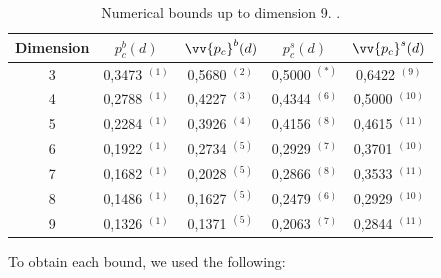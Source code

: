 \documentclass{aptpub}
\begin{document}
\begin{table}[h!]
    \centering

\bigskip
   
\begin{tabular}{|c|c|c|c|c|}  

\hline
\textbf{Dimension} & $p_c^b(d)$ & $\vv{p_c}^b(d)$ & $p_c^s(d)$ &   $\vv{p_c}^s(d)$\\ \hline

3 & 0,3473 $^{(1)}$ &0,5680 $^{(2)}$&0,5000 $^{(*)}$&0,6422 $^{(9)}$\\   \hline

4 & 0,2788 $^{(1)}$ &0,4227 $^{(3)}$&0,4344 $^{(6)}$&0,5000 $^{(10)}$ \\   \hline

5 & 0,2284 $^{(1)}$ & 0,3926 $^{(4)}$&0,4156 $^{(8)}$& 0,4615 $^{(11)}$\\   \hline

6 & 0,1922 $^{(1)}$& 0,2734 $^{(5)}$ & 0,2929 $^{(7)}$& 0,3701 $^{(10)}$\\   \hline

7 & 0,1682  $^{(1)}$& 0,2028 $^{(5)}$& 0,2866 $^{(8)}$& 0,3533 $^{(11)}$\\   \hline

8 & 0,1486 $^{(1)}$&0,1627  $^{(5)}$& 0,2479 $^{(6)}$ &0,2929 $^{(10)}$\\   \hline

9 & 0,1326 $^{(1)}$ &0,1371 $^{(5)}$&0,2063 $^{(7)}$&0,2844 $^{(11)}$\\   \hline

\end{tabular}


\caption{Numerical bounds up to dimension 9.  .}
   
\label{tab:my_label}
  
\end{table}




\vspace{0.5cm}

To obtain each bound, we used the following:
\end{document}
